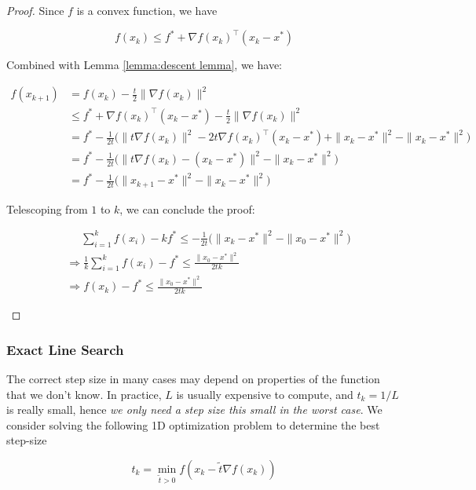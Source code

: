 \documentclass[12pt]{article} %
\theoremstyle{definition}
\begin{document}
\begin{proof}
	Since $f$ is a convex function, we have

	$$
		f(x_k) \le  f^* + \nabla f(x_k)^\intercal (x_k - x^*)
	$$

	Combined with Lemma \ref{lemma:descent lemma}, we have:

	\begin{ceqn}
		\begin{align*}
			f(x_{k + 1}) 
			&=  f(x_k) - \frac{t}{2} \| \nabla f(x_k) \|^2 \\
			&\le  f^* + \nabla f(x_k)^\intercal (x_k - x^*) - \frac{t}{2} \| \nabla f(x_k) \|^2 \\
			&=  f^* - \frac{1}{2t} \big( \| t \nabla f(x_k) \|^2 - 2t \nabla f(x_k)^\intercal (x_k - x^*) + \|x_k - x^*\|^2 - \|x_k - x^*\|^2 \big) \\
			&=  f^* - \frac{1}{2t} \big( \|t \nabla f(x_k) - (x_k - x^*)\|^2 - \|x_k - x^*\|^2 \big) \\
			&=  f^* - \frac{1}{2t} \big( \|x_{k +1} - x^* \|^2 - \|x_k - x^*\|^2 \big)
		\end{align*}
	\end{ceqn}

	Telescoping from $1$ to $k$, we can conclude the proof:

	\begin{ceqn}
		\begin{align*}
			& \, \, \quad  \sum_{i = 1}^k f(x_i) - k f^* \le  - \frac{1}{2t} \big( \|x_k - x^* \|^2 - \|x_0 - x^*\|^2 \big) \\
			&\Rightarrow \frac{1}{k} \sum_{i = 1}^k f(x_i) - f^*  \le \frac{\|x_0 - x^*\|^2}{2tk} \\
			&\Rightarrow f(x_k) - f^* \le \frac{\|x_0 - x^*\|^2}{2tk}
		\end{align*}
	\end{ceqn}
\end{proof}

\subsubsection*{Exact Line Search}
 The correct step size in many cases may depend on properties of the function that we don't know. In practice,  $L$ is usually expensive to compute, and $t_k = 1 / L$ is really small, hence \emph{we only need a step size this small in the worst case}. We consider solving the following 1D optimization
 problem to determine the best step-size

$$
	t_k = \min_{\tilde{t} > 0} f(x_k - \tilde{t} \nabla f(x_k))
$$
\end{document}
